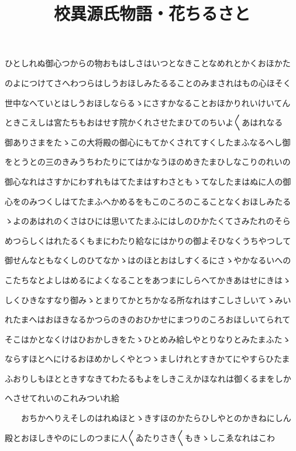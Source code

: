 \documentclass[a4paper,11pt,landscape]{ltjtarticle}
\title{校異源氏物語・花ちるさと}
\date{}
\begin{document}
\maketitle

ひとしれぬ御心つからの物おもはしさはいつとなきことなめれとかくおほかた
\par\medskip
のよにつけてさへわつらはしうおほしみたるることのみまされはもの心ほそく
\par\medskip
世中なへていとはしうおほしならるゝにさすかなることおほかりれいけいてん
\par\medskip
ときこえしは宮たちもおはせす院かくれさせたまひてのちいよ〱あはれなる
\par\medskip
御ありさまをたゝこの大将殿の御心にもてかくされてすくしたまふなるへし御
\par\medskip
をとうとの三のきみうちわたりにてはかなうほのめきたまひしなこりのれいの
\par\medskip
御心なれはさすかにわすれもはてたまはすわさともゝてなしたまはぬに人の御
\par\medskip
心をのみつくしはてたまふへかめるをもこのころのこることなくおほしみたる
\par\medskip
ゝよのあはれのくさはひには思いてたまふにはしのひかたくてさみたれのそら
\par\medskip
めつらしくはれたるくもまにわたり給なにはかりの御よそひなくうちやつして
\par\medskip
御せんなともなくしのひてなかゝはのほとおはしすくるにさゝやかなるいへの
\par\medskip
こたちなとよしはめるによくなることをあつまにしらへてかきあはせにきはゝ
\par\medskip
しくひきなすなり御みゝとまりてかとちかなる所なれはすこしさしいてゝみい
\par\medskip
れたまへはおほきなるかつらのきのおひかせにまつりのころおほしいてられて
\par\medskip
そこはかとなくけはひおかしきをたゝひとめみ給しやとりなりとみたまふたゝ
\par\medskip
ならすほとへにけるおほめかしくやとつゝましけれとすきかてにやすらひたま
\par\medskip
ふおりしもほとときすなきてわたるもよをしきこえかほなれは御くるまをしか
\par\medskip
へさせてれいのこれみついれ給
\par\medskip
　　おちかへりえそしのはれぬほとゝきすほのかたらひしやとのかきねにしん
\par\medskip
殿とおほしきやのにしのつまに人〱ゐたりさき〱もきゝしこゑなれはこわ
\par\medskip
\end{document}
